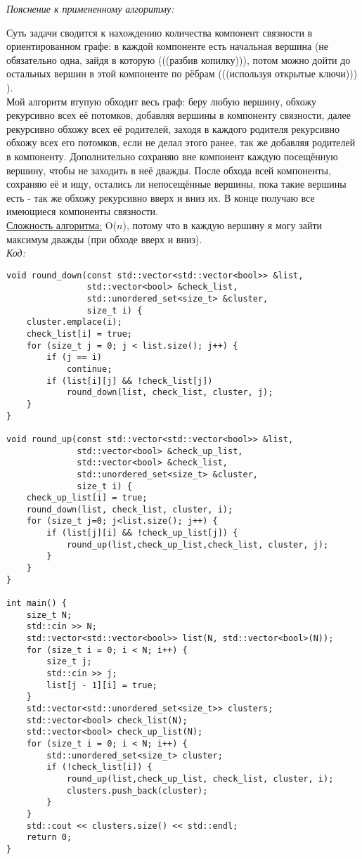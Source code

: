 \textit{Пояснение к примененному алгоритму:} \par
Суть задачи сводится к нахождению количества компонент связности в ориентированном графе: в каждой компоненте есть начальная вершина (не обязательно
одна, зайдя в которую (((разбив копилку))), потом можно дойти до остальных вершин в этой компоненте по рёбрам (((используя открытые ключи))) ).\\
Мой алгоритм втупую обходит весь граф: беру любую вершину, обхожу рекурсивно всех её потомков, добавляя вершины в компоненту связности, далее рекурсивно
обхожу всех её родителей, заходя в каждого родителя рекурсивно обхожу всех его потомков, если не делал этого ранее, так же добавляя родителей в компоненту.
Дополнительно сохраняю вне компонент каждую посещённую вершину, чтобы не заходить в неё дважды. После обхода всей компоненты, сохраняю её и ищу, остались ли
непосещённые вершины, пока такие вершины есть - так же обхожу рекурсивно вверх и вниз их. В конце получаю все имеющиеся компоненты связности.\\
\underline{Сложность алгоритма:} O($n$), потому что в каждую вершину я могу зайти максимум дважды (при обходе вверх и вниз).\\

\textit{Код:}
\tiny
\begin{center}
    \begin{verbatim}
void round_down(const std::vector<std::vector<bool>> &list,
                std::vector<bool> &check_list,
                std::unordered_set<size_t> &cluster,
                size_t i) {
    cluster.emplace(i);
    check_list[i] = true;
    for (size_t j = 0; j < list.size(); j++) {
        if (j == i)
            continue;
        if (list[i][j] && !check_list[j])
            round_down(list, check_list, cluster, j);
    }
}

void round_up(const std::vector<std::vector<bool>> &list,
              std::vector<bool> &check_up_list,
              std::vector<bool> &check_list,
              std::unordered_set<size_t> &cluster,
              size_t i) {
    check_up_list[i] = true;
    round_down(list, check_list, cluster, i);
    for (size_t j=0; j<list.size(); j++) {
        if (list[j][i] && !check_up_list[j]) {
            round_up(list,check_up_list,check_list, cluster, j);
        }
    }
}

int main() {
    size_t N;
    std::cin >> N;
    std::vector<std::vector<bool>> list(N, std::vector<bool>(N));
    for (size_t i = 0; i < N; i++) {
        size_t j;
        std::cin >> j;
        list[j - 1][i] = true;
    }
    std::vector<std::unordered_set<size_t>> clusters;
    std::vector<bool> check_list(N);
    std::vector<bool> check_up_list(N);
    for (size_t i = 0; i < N; i++) {
        std::unordered_set<size_t> cluster;
        if (!check_list[i]) {
            round_up(list,check_up_list, check_list, cluster, i);
            clusters.push_back(cluster);
        }
    }
    std::cout << clusters.size() << std::endl;
    return 0;
}
    \end{verbatim}
\end{center}
\normalsize
\newpage


